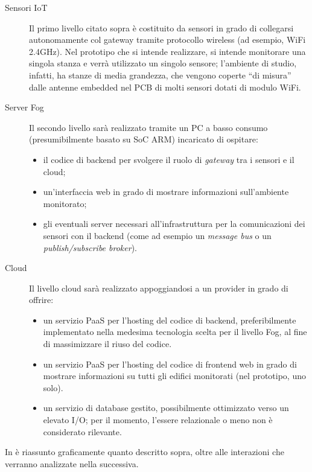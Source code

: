 \begin{description}
  \item[Sensori IoT]
    Il primo livello citato sopra è costituito da sensori in grado di collegarsi autonomamente col gateway tramite protocollo wireless (ad esempio, WiFi 2.4GHz).
    Nel prototipo che si intende realizzare, si intende monitorare una singola stanza e verrà utilizzato un singolo sensore;
    l'ambiente di studio, infatti, ha stanze di media grandezza, che vengono coperte ``di misura'' dalle antenne embedded nel PCB di molti sensori dotati di modulo WiFi.
  \item[Server Fog] %
    Il secondo livello sarà realizzato tramite un PC a basso consumo (presumibilmente basato su SoC ARM) incaricato di ospitare:
    \begin{itemize}
      \item il codice di backend per svolgere il ruolo di \emph{gateway} tra i sensori e il cloud;
      \item un'interfaccia web in grado di mostrare informazioni sull'ambiente monitorato;
      \item gli eventuali server necessari all'infrastruttura per la comunicazioni dei sensori con il backend (come ad esempio un \emph{message bus} o un \emph{publish/subscribe broker}).
    \end{itemize}
  \item[Cloud]
    Il livello cloud sarà realizzato appoggiandosi a un provider in grado di offrire:
    \begin{itemize}
      \item
        un servizio PaaS per l'hosting del codice di backend,
        preferibilmente implementato nella medesima tecnologia scelta per il livello Fog, al fine di massimizzare il riuso del codice.
      \item
        un servizio PaaS per l'hosting del codice di frontend web in grado di mostrare informazioni su tutti gli edifici monitorati (nel prototipo, uno solo).
      \item
        un servizio di database gestito, possibilmente ottimizzato verso un elevato I/O\@;
        per il momento, l'essere relazionale o meno non è considerato rilevante.
    \end{itemize}
\end{description}

In  è riassunto graficamente quanto descritto sopra, oltre alle interazioni che verranno analizzate nella  successiva.

